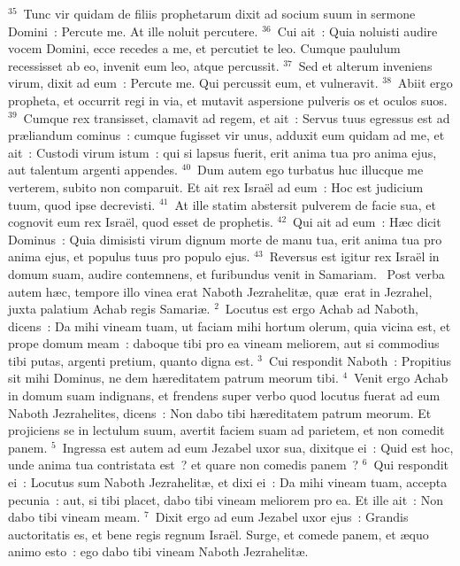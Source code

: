 ${}^{35}$~Tunc vir quidam de filiis prophetarum dixit ad socium suum in sermone Domini~: Percute me. At ille noluit percutere.
${}^{36}$~Cui ait~: Quia noluisti audire vocem Domini, ecce recedes a me, et percutiet te leo. Cumque paululum recessisset ab eo, invenit eum leo, atque percussit.
${}^{37}$~Sed et alterum inveniens virum, dixit ad eum~: Percute me. Qui percussit eum, et vulneravit.
${}^{38}$~Abiit ergo propheta, et occurrit regi in via, et mutavit aspersione pulveris os et oculos suos.
${}^{39}$~Cumque rex transisset, clamavit ad regem, et ait~: Servus tuus egressus est ad pr\ae liandum cominus~: cumque fugisset vir unus, adduxit eum quidam ad me, et ait~: Custodi virum istum~: qui si lapsus fuerit, erit anima tua pro anima ejus, aut talentum argenti appendes.
${}^{40}$~Dum autem ego turbatus huc illucque me verterem, subito non comparuit. Et ait rex Isra\"el ad eum~: Hoc est judicium tuum, quod ipse decrevisti.
${}^{41}$~At ille statim abstersit pulverem de facie sua, et cognovit eum rex Isra\"el, quod esset de prophetis.
${}^{42}$~Qui ait ad eum~: H\ae c dicit Dominus~: Quia dimisisti virum dignum morte de manu tua, erit anima tua pro anima ejus, et populus tuus pro populo ejus.
${}^{43}$~Reversus est igitur rex Isra\"el in domum suam, audire contemnens, et furibundus venit in Samariam.
~\lettrine[lines=10,image=true,loversize=0.05,lraise=-0.03]{P}{}ost verba autem h\ae c, tempore illo vinea erat Naboth Jezrahelit\ae , qu\ae\ erat in Jezrahel, juxta palatium Achab regis Samari\ae .
${}^{2}$~Locutus est ergo Achab ad Naboth, dicens~: Da mihi vineam tuam, ut faciam mihi hortum olerum, quia vicina est, et prope domum meam~: daboque tibi pro ea vineam meliorem, aut si commodius tibi putas, argenti pretium, quanto digna est.
${}^{3}$~Cui respondit Naboth~: Propitius sit mihi Dominus, ne dem h\ae reditatem patrum meorum tibi.
${}^{4}$~Venit ergo Achab in domum suam indignans, et frendens super verbo quod locutus fuerat ad eum Naboth Jezrahelites, dicens~: Non dabo tibi h\ae reditatem patrum meorum. Et projiciens se in lectulum suum, avertit faciem suam ad parietem, et non comedit panem.
${}^{5}$~Ingressa est autem ad eum Jezabel uxor sua, dixitque ei~: Quid est hoc, unde anima tua contristata est~? et quare non comedis panem~?
${}^{6}$~Qui respondit ei~: Locutus sum Naboth Jezrahelit\ae , et dixi ei~: Da mihi vineam tuam, accepta pecunia~: aut, si tibi placet, dabo tibi vineam meliorem pro ea. Et ille ait~: Non dabo tibi vineam meam.
${}^{7}$~Dixit ergo ad eum Jezabel uxor ejus~: Grandis auctoritatis es, et bene regis regnum Isra\"el. Surge, et comede panem, et \ae quo animo esto~: ego dabo tibi vineam Naboth Jezrahelit\ae .


